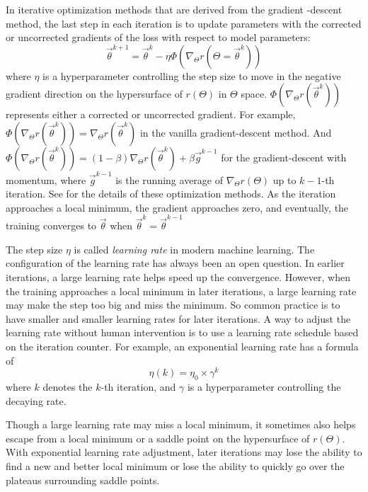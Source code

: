 In iterative optimization methods that are derived from the gradient -descent method, the last step in each iteration is to update parameters with the corrected or uncorrected gradients of the loss with respect to model parameters:
\begin{equation}
    \vec{\theta}^{k+1} = \vec{\theta}^{k} - \eta\Phi(\nabla_{\Theta}r(\Theta=\vec{\theta}^k))
\end{equation}
where $\eta$ is a hyperparameter controlling the step size to move in the negative gradient direction on the hypersurface of $r(\Theta)$ in $\Theta$ space.
$\Phi(\nabla_{\Theta}r(\vec{\theta}^k))$ represents either a corrected or uncorrected gradient.
For example, $\Phi(\nabla_{\Theta}r(\vec{\theta}^k))=\nabla_{\Theta}r(\vec{\theta}^k)$ in the vanilla gradient-descent method.
And $\Phi(\nabla_{\Theta}r(\vec{\theta}^k)) = \left(1-\beta\right)\nabla_{\Theta}r(\vec{\theta}^k) + \beta \vec{g}^{k-1}$ for the gradient-descent with momentum, where $\vec{g}^{k-1}$ is the running average of $\nabla_{\Theta}r(\Theta)$ up to $k-1$-th iteration.
See \cite[Section~8.3]{goodfellow_deep_2016} for the details of these optimization methods.
As the iteration approaches a local minimum, the gradient approaches zero, and eventually, the training converges to $\vec{\theta}$ when $\vec{\theta}^k=\vec{\theta}^{k-1}$

The step size $\eta$ is called {\it learning rate} in modern machine learning.
The configuration of the learning rate has always been an open question.
In earlier iterations, a large learning rate helps speed up the convergence.
However, when the training approaches a local minimum in later iterations, a large learning rate may make the step too big and miss the minimum.
So common practice is to have smaller and smaller learning rates for later iterations.
A way to adjust the learning rate without human intervention is to use a learning rate schedule based on the iteration counter.
For example, an exponential learning rate has a formula of
\begin{equation}
    \eta(k) = \eta_0 \times \gamma^k
\end{equation}
where $k$ denotes the $k$-th iteration, and $\gamma$ is a hyperparameter controlling the decaying rate.

Though a large learning rate may miss a local minimum, it sometimes also helps escape from a local minimum or a saddle point on the hypersurface of $r(\Theta)$.
With exponential learning rate adjustment, later iterations may lose the ability to find a new and better local minimum or lose the ability to quickly go over the plateaus surrounding saddle points.

